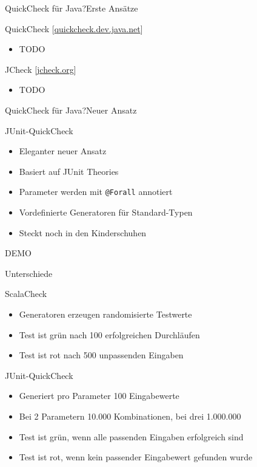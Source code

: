 
\begin{frame}{QuickCheck für Java?}{Erste Ansätze}
	\begin{block}{QuickCheck [\href{https://quickcheck.dev.java.net/}{quickcheck.dev.java.net}]}
	\begin{itemize}
		\item TODO
	\end{itemize}
	\end{block}
	\pause
	\begin{block}{JCheck [\href{http://www.jcheck.org/}{jcheck.org}]}
	\begin{itemize}
		\item TODO
	\end{itemize}
	\end{block}
\end{frame}
\begin{frame}{QuickCheck für Java?}{Neuer Ansatz}
	\begin{block}{JUnit-QuickCheck}
	\begin{itemize}
		\item Eleganter neuer Ansatz
		\item Basiert auf JUnit Theories
		\item Parameter werden mit \texttt{@Forall} annotiert
		\item Vordefinierte Generatoren für Standard-Typen
		\item Steckt noch in den Kinderschuhen
	\end{itemize}
	\end{block}
\end{frame}

\begin{frame}{}
\begin{center}
DEMO
\end{center}
\end{frame}


\begin{frame}{Unterschiede}
	\begin{block}{ScalaCheck}
	\begin{itemize}
		\item Generatoren erzeugen randomisierte Testwerte
		\item Test ist grün nach 100 erfolgreichen Durchläufen
		\item Test ist rot nach 500 unpassenden Eingaben
	\end{itemize}
	\end{block}
	\pause
	\begin{block}{JUnit-QuickCheck}
	\begin{itemize}
		\item Generiert pro Parameter 100 Eingabewerte
		\item Bei 2 Parametern 10.000 Kombinationen, bei drei 1.000.000
		\item Test ist grün, wenn alle passenden Eingaben erfolgreich sind
		\item Test ist rot, wenn kein passender Eingabewert gefunden wurde
	\end{itemize}
	\end{block}
\end{frame}

